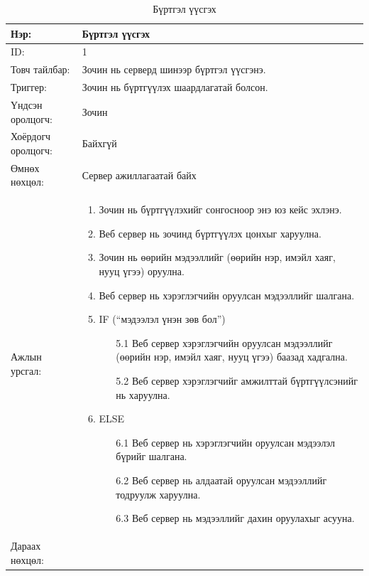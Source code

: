 \begin{center}
	\begin{table}[!htbp]
		\caption{Бүртгэл үүсгэх}
		\begin{tabular}{|p{4cm}|p{11cm}|}
		\hline
			Нэр: & Бүртгэл үүсгэх \\
		\hline
			ID: & 1 \\
		\hline
			Товч тайлбар: & Зочин нь серверд шинээр бүртгэл үүсгэнэ. \\
		\hline
			Триггер: & Зочин нь бүртгүүлэх шаардлагатай болсон. \\
		\hline
			Үндсэн оролцогч: & Зочин \\
		\hline
			Хоёрдогч оролцогч: & Байхгүй  \\
		\hline
			Өмнөх нөхцөл: &  Сервер ажиллагаатай байх\\
		\hline
			Ажлын урсгал: & \begin{enumerate}
						 	\item Зочин нь бүртгүүлэхийг сонгосноор энэ юз кейс эхлэнэ. 
						 	\item Веб сервер нь зочинд бүртгүүлэх цонхыг харуулна. 
						 	\item Зочин нь өөрийн мэдээллийг (өөрийн нэр, имэйл хаяг, нууц үгээ) оруулна. 
						 	\item Веб сервер нь хэрэглэгчийн оруулсан мэдээллийг шалгана. 
						 	\item IF (“мэдээлэл үнэн зөв бол”)
							 	\begin{enumerate}
							 		\item[5.1] Веб сервер хэрэглэгчийн оруулсан мэдээллийг (өөрийн нэр, имэйл хаяг, нууц үгээ) баазад хадгална.
							 		\item[5.2] Веб сервер хэрэглэгчийг амжилттай бүртгүүлсэнийг нь харуулна. 
							 	\end{enumerate}
						 	\item ELSE
							 	\begin{enumerate}
							 		\item[6.1] Веб сервер нь хэрэглэгчийн оруулсан мэдээлэл бүрийг шалгана.  
							 		\item[6.2] Веб сервер нь алдаатай оруулсан мэдээллийг тодруулж харуулна. 
							 		\item[6.3] Веб сервер нь мэдээллийг дахин оруулахыг асууна. 
							 	\end{enumerate}
						  \end{enumerate}
\\					  \hline
				Дараах нөхцөл: &
				 \begin{enumerate}

\end{enumerate}
\end{tabular}
\end{table}
\end{center}
